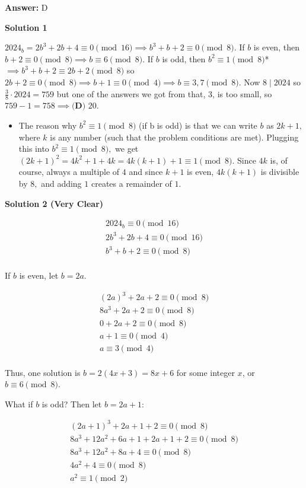 \begin{enumerate}
 \textbf{Answer: }D



\textbf{Solution 1}

$2024_b = 2b^3+2b+4\equiv 0\pmod{16}\implies b^3+b+2\equiv 0\pmod 8$. If $b$ is even, then $b+2\equiv 0\pmod 8\implies b\equiv 6\pmod 8$. If $b$ is odd, then $b^2\equiv 1\pmod 8$* $\implies b^3+b+2\equiv 2b+2\pmod 8$ so $2b+2\equiv 0\pmod 8\implies b+1\equiv 0\pmod 4\implies b\equiv 3,7\pmod 8$. Now $8\mid 2024$ so $\frac38\cdot 2024=759$ but one of the answers we got from that, $3$, is too small, so $759 - 1 = 758\implies\boxed{\textbf{(D) }20}$.

 
            \begin{itemize}
        \item The reason why $b^2\equiv 1\pmod 8$ (if b is odd) is that we can write $b$ as $2k+1,$ where $k$ is any number (such that the problem conditions are met). Plugging this into $b^2\equiv 1\pmod 8,$ we get $(2k+1)^2=4k^2+1+4k=4k(k+1)+1\equiv 1\pmod 8.$ Since $4k$ is, of course, always a multiple of $4$ and since $k+1$ is even, $4k(k+1)$ is divisible by $8,$ and adding $1$ creates a remainder of $1.$
            \end{itemize}
            



\textbf{Solution 2 (Very Clear)}

\begin{align*}2024_b\equiv0\pmod{16} \\2b^3+2b+4\equiv0\pmod{16} \\b^3+b+2\equiv0\pmod8 \\\end{align*}


 If $b$ is even, let $b=2a$. 

 \begin{align*}(2a)^3+2a+2\equiv0\pmod8 \\8a^3+2a+2\equiv0\pmod8 \\0+2a+2\equiv0\pmod8 \\a+1\equiv0\pmod4 \\a\equiv3\pmod4 \\\end{align*}


 Thus, one solution is $b=2(4x+3)=8x+6$ for some integer $x$, or $b\equiv6\pmod8$. 

 What if $b$ is odd? Then let $b=2a+1$: 

 \begin{align*}(2a+1)^3+2a+1+2\equiv0\pmod8 \\8a^3+12a^2+6a+1+2a+1+2\equiv0\pmod8 \\8a^3+12a^2+8a+4\equiv0\pmod8 \\4a^2+4\equiv0\pmod8 \\a^2\equiv1\pmod2 \\\end{align*}



\end{enumerate}
